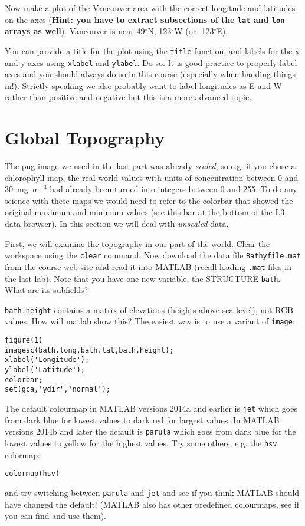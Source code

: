 \documentclass[letterpaper,10pt]{article}
\begin{document}
Now make a plot of the Vancouver area with the correct longitude and latitudes on the axes ({\bf Hint:
you have to extract subsections of the \verb+lat+ and \verb+lon+ arrays as well}).
Vancouver is near 49$^\circ$N, 123$^\circ$W (or -123$^\circ$E).

You can provide a title for the plot using the \verb+title+ function, and labels for
the x and y axes using \verb+xlabel+ and \verb+ylabel+. Do so. It is good practice to
properly label axes and you should always do so in this course (especially when handing
things in!). Strictly speaking we also probably want to label longitudes as E and W
rather than positive and negative but this is a more advanced topic.


\section{Global Topography}

The png image we used in the last part was already {\it scaled}, so e.g. if you chose a chlorophyll map, the real world values with units of concentration between 0
and 30~mg~m$^{-3}$ had already been
turned into integers between 0 and 255. To do any science with these maps we would need to
refer to the colorbar that showed the original maximum and minimum values 
(see this bar at the bottom of the L3 data browser). In this section we will deal
with {\it unscaled} data.

First, we will examine the topography in our part of the world. Clear the workspace using the \verb+clear+
command.
Now download the data file
\verb+Bathyfile.mat+ from the course web site and read it into MATLAB (recall loading \verb+.mat+ files in the
last lab). Note that you have one new variable, the STRUCTURE \verb+bath+. What are its
subfields?

\verb+bath.height+ contains a matrix of elevations (heights above sea level), not RGB values.
How will matlab show this? The easiest way is to use a variant of \verb+image+:
\begin{verbatim}
figure(1)
imagesc(bath.long,bath.lat,bath.height);
xlabel('Longitude');
ylabel('Latitude');
colorbar;
set(gca,'ydir','normal');
\end{verbatim}

The default colourmap in MATLAB versions 2014a and earlier is \verb+jet+ which goes from dark blue for lowest values to dark red
for largest values. In MATLAB versions 2014b and later the default is \verb+parula+ which goes from dark blue for the lowest values to yellow for the highest values.  Try some others, e.g. the \verb+hsv+ colormap:
\begin{verbatim}
colormap(hsv)
\end{verbatim}
and try switching between \verb+parula+ and \verb+jet+ and see if you think MATLAB should have changed the default!
(MATLAB also has other predefined colourmaps, see if you can find and use them).
\end{document}

